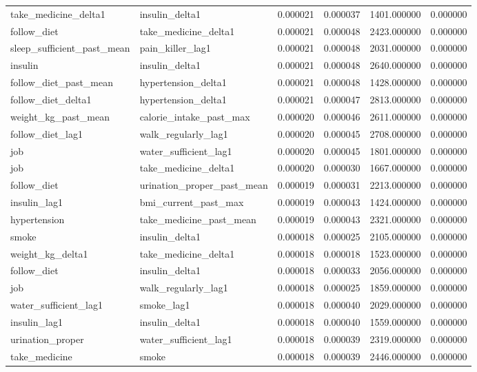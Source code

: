 \begin{longtable}{llrrrr}
take\_medicine\_delta1 & insulin\_delta1 & 0.000021 & 0.000037 & 1401.000000 & 0.000000 \\
follow\_diet & take\_medicine\_delta1 & 0.000021 & 0.000048 & 2423.000000 & 0.000000 \\
sleep\_sufficient\_past\_mean & pain\_killer\_lag1 & 0.000021 & 0.000048 & 2031.000000 & 0.000000 \\
insulin & insulin\_delta1 & 0.000021 & 0.000048 & 2640.000000 & 0.000000 \\
follow\_diet\_past\_mean & hypertension\_delta1 & 0.000021 & 0.000048 & 1428.000000 & 0.000000 \\
follow\_diet\_delta1 & hypertension\_delta1 & 0.000021 & 0.000047 & 2813.000000 & 0.000000 \\
weight\_kg\_past\_mean & calorie\_intake\_past\_max & 0.000020 & 0.000046 & 2611.000000 & 0.000000 \\
follow\_diet\_lag1 & walk\_regularly\_lag1 & 0.000020 & 0.000045 & 2708.000000 & 0.000000 \\
job & water\_sufficient\_lag1 & 0.000020 & 0.000045 & 1801.000000 & 0.000000 \\
job & take\_medicine\_delta1 & 0.000020 & 0.000030 & 1667.000000 & 0.000000 \\
follow\_diet & urination\_proper\_past\_mean & 0.000019 & 0.000031 & 2213.000000 & 0.000000 \\
insulin\_lag1 & bmi\_current\_past\_max & 0.000019 & 0.000043 & 1424.000000 & 0.000000 \\
hypertension & take\_medicine\_past\_mean & 0.000019 & 0.000043 & 2321.000000 & 0.000000 \\
smoke & insulin\_delta1 & 0.000018 & 0.000025 & 2105.000000 & 0.000000 \\
weight\_kg\_delta1 & take\_medicine\_delta1 & 0.000018 & 0.000018 & 1523.000000 & 0.000000 \\
follow\_diet & insulin\_delta1 & 0.000018 & 0.000033 & 2056.000000 & 0.000000 \\
job & walk\_regularly\_lag1 & 0.000018 & 0.000025 & 1859.000000 & 0.000000 \\
water\_sufficient\_lag1 & smoke\_lag1 & 0.000018 & 0.000040 & 2029.000000 & 0.000000 \\
insulin\_lag1 & insulin\_delta1 & 0.000018 & 0.000040 & 1559.000000 & 0.000000 \\
urination\_proper & water\_sufficient\_lag1 & 0.000018 & 0.000039 & 2319.000000 & 0.000000 \\
take\_medicine & smoke & 0.000018 & 0.000039 & 2446.000000 & 0.000000 \\

\end{longtable}
